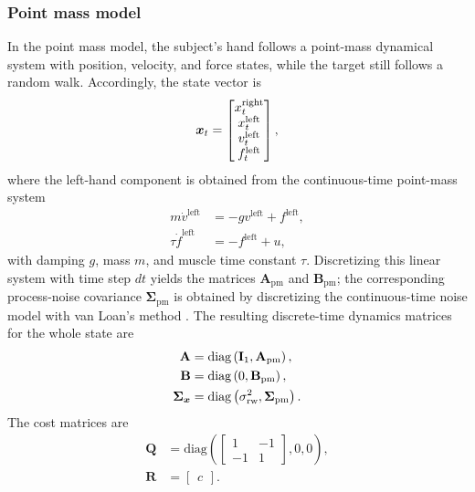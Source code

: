 \documentclass{article}
\begin{document}
\subsubsection{Point mass model}
In the point mass model, the subject's hand follows a point-mass dynamical system with position, velocity, and force states, while the target still follows a random walk. Accordingly, the state vector is
\begin{align}
    {\bm x}_t = \begin{bmatrix}
        x^\text{right}_t \\ x^\text{left}_t \\ v^\text{left}_t \\ f^\text{left}_t
    \end{bmatrix},
\end{align}
where the left-hand component is obtained from the continuous-time point-mass system \citep[see e.g.][for details]{kasuga2022integration}
\begin{align}
    m \dot v^\text{left} &= - g v^\text{left} + f^\text{left}, \\
    \tau \dot f^\text{left} &= - f^\text{left} + u,
\end{align}
with damping $g$, mass $m$, and muscle time constant $\tau$. Discretizing this linear system with time step $dt$ yields the matrices $\mathbf A_{\mathrm{pm}}$ and $\mathbf B_{\mathrm{pm}}$; the corresponding process-noise covariance $\mathbf \Sigma_{\mathrm{pm}}$ is obtained by discretizing the continuous-time noise model with van Loan's method \citep{van2003computing}. The resulting discrete-time dynamics matrices for the whole state are
\begin{align}
    \mathbf A &= \text{diag}\left(\operatorname{{\mathbf{I}}}_1, \mathbf A_{\mathrm{pm}}\right), \\
    \mathbf B &= \text{diag}\left(0, \mathbf B_{\mathrm{pm}}\right), \\
    \mathbf \Sigma_{\bm x} &= \text{diag}\left(\sigma_\text{rw}^2, \mathbf \Sigma_{\mathrm{pm}}\right).
\end{align}
The cost matrices are
\begin{align}
    \mathbf Q &= \text{diag}\left(\begin{bmatrix} 1 & -1 \\ -1 & 1 \end{bmatrix}, 0, 0\right), \\
    \mathbf R &= \begin{bmatrix} c \end{bmatrix}.
\end{align}
\end{document}
